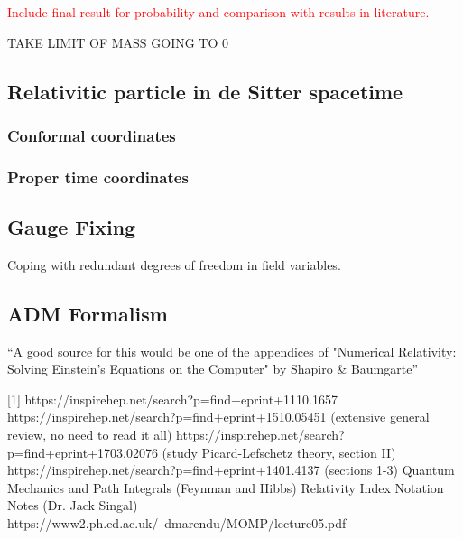 \documentclass[12pt]{revtex4}
\newcommand{\red}{\textcolor{red}}
\begin{document}
\red{Include final result for probability and comparison with results in literature.}

TAKE LIMIT OF MASS GOING TO 0
\subsection{Relativitic particle in de Sitter spacetime}

\subsubsection{Conformal coordinates}


\subsubsection{Proper time coordinates}

\subsection{Gauge Fixing} \label{gauge}
Coping with redundant degrees of freedom in field variables.

\subsection{ADM Formalism} \label{ADM}
``A good source for this would be one of the appendices of "Numerical Relativity: Solving Einstein's Equations on the Computer" by Shapiro \& Baumgarte''

\begin{thebibliography}{}

[1] https://inspirehep.net/search?p=find+eprint+1110.1657 \newline
[2] https://inspirehep.net/search?p=find+eprint+1510.05451  (extensive general review, no need to read it all) \newline
[3] https://inspirehep.net/search?p=find+eprint+1703.02076   (study Picard-Lefschetz theory, section II) \newline
[4] https://inspirehep.net/search?p=find+eprint+1401.4137   (sections 1-3) \newline
[5] Quantum Mechanics and Path Integrals (Feynman and Hibbs) \newline
[6] Relativity Index Notation Notes (Dr. Jack Singal) \newline
[7] https://www2.ph.ed.ac.uk/~dmarendu/MOMP/lecture05.pdf \newline
[8] \newline
\end{thebibliography}
\end{document}
